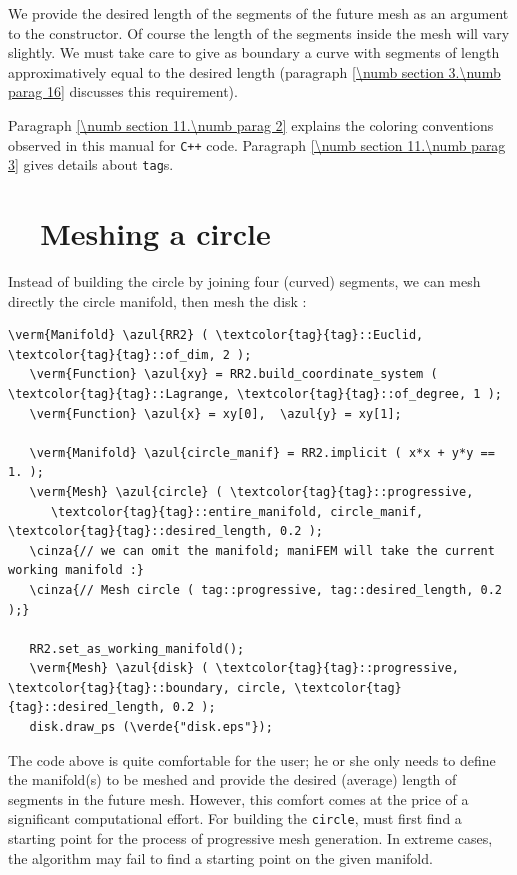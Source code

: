 We provide the desired length of the segments of the future mesh as an argument to the
constructor.
Of course the length of the segments inside the mesh will vary slightly.
We must take care to give as boundary a curve with segments of length approximatively equal
to the desired length (paragraph \ref{\numb section 3.\numb parag 16} discusses
this requirement).

Paragraph \ref{\numb section 11.\numb parag 2} explains the coloring conventions observed
in this manual for {\tt C++} code.
Paragraph \ref{\numb section 11.\numb parag 3} gives details about {\small\tt \textcolor{tag}{tag}}s.


\section{~~Meshing a circle}\label{\numb section 3.\numb parag 2}

Instead of building the circle by joining four (curved) segments, we can mesh directly
the circle manifold, then mesh the disk :

\begin{Verbatim}[commandchars=\\\{\},formatcom=\small\tt,frame=single,
   label=parag-\ref{\numb section 3.\numb parag 2}.cpp,rulecolor=\color{coment},
   baselinestretch=0.94,framesep=2mm                                            ]
   \verm{Manifold} \azul{RR2} ( \textcolor{tag}{tag}::Euclid, \textcolor{tag}{tag}::of_dim, 2 );
   \verm{Function} \azul{xy} = RR2.build_coordinate_system ( \textcolor{tag}{tag}::Lagrange, \textcolor{tag}{tag}::of_degree, 1 );
   \verm{Function} \azul{x} = xy[0],  \azul{y} = xy[1];
   
   \verm{Manifold} \azul{circle_manif} = RR2.implicit ( x*x + y*y == 1. );
   \verm{Mesh} \azul{circle} ( \textcolor{tag}{tag}::progressive,
      \textcolor{tag}{tag}::entire_manifold, circle_manif, \textcolor{tag}{tag}::desired_length, 0.2 );
   \cinza{// we can omit the manifold; maniFEM will take the current working manifold :}
   \cinza{// Mesh circle ( tag::progressive, tag::desired_length, 0.2 );}
   
   RR2.set_as_working_manifold();
   \verm{Mesh} \azul{disk} ( \textcolor{tag}{tag}::progressive, \textcolor{tag}{tag}::boundary, circle, \textcolor{tag}{tag}::desired_length, 0.2 );
   disk.draw_ps (\verde{"disk.eps"});
\end{Verbatim}

The code above is quite comfortable for the user; he or she only needs to define
the manifold(s) to be meshed and provide the desired (average) length of segments
in the future mesh.
However, this comfort comes at the price of a significant computational effort.
For building the {\small\tt circle}, {\ManiFEM} must first find a starting point for the process
of progressive mesh generation.
In extreme cases, the algorithm may fail to find a starting point on the given manifold.

